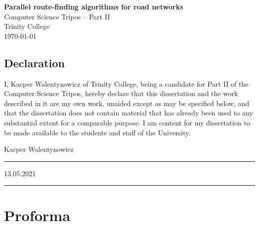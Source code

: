 \documentclass[12pt,a4paper,oneside,openright]{report}
\begin{document}
%




\pagestyle{empty}


\vspace*{60mm}
\begin{center}
\Huge
\textbf{Parallel route-finding algorithms for road networks} \\[5mm]
Computer Science Tripos -- Part II \\[5mm]
Trinity College \\[5mm]
\today  %
\end{center}
\newpage

\pagestyle{plain}
\section*{Declaration}

I, Kacper Walentynowicz of Trinity College, being a candidate for Part II of the Computer Science Tripos, hereby declare that this dissertation and the work described in it are my own work, unaided except as may be specified below, and that the dissertation does not contain material that has already been used to any substantial extent for a comparable purpose. I am content for my dissertation to be made available to the students and staff of the University.

\bigskip
{}
\vspace{20pt}
Kacper Walentynowicz
\par\noindent\rule{\textwidth}{0.4pt}

\medskip
{}
\vspace{20pt}
13.05.2021
\par\noindent\rule{\textwidth}{0.4pt}

\chapter*{Proforma}
\end{document}
